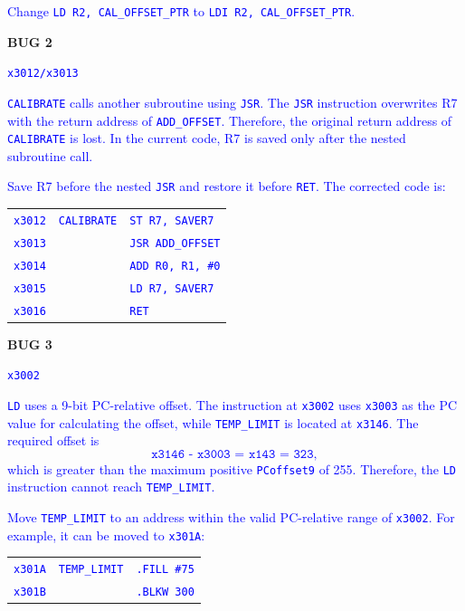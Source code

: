 \documentclass{article}
\begin{document}
\begin{enumerate}[label=(\alph*)]
\textcolor{blue}{
Change \texttt{LD R2, CAL\_OFFSET\_PTR} to
\texttt{LDI R2, CAL\_OFFSET\_PTR}.
}

\bigskip


\textbf{BUG 2}

\textcolor{blue}{\texttt{x3012/x3013}}

\textcolor{blue}{
\texttt{CALIBRATE} calls another subroutine using \texttt{JSR}.
The \texttt{JSR} instruction overwrites R7 with the return address
of \texttt{ADD\_OFFSET}. Therefore, the original return address of
\texttt{CALIBRATE} is lost. In the current code, R7 is saved only
after the nested subroutine call.
}

\textcolor{blue}{
Save R7 before the nested \texttt{JSR} and restore it before
\texttt{RET}. The corrected code is:
}

\begin{center}
\textcolor{blue}{
\begin{tabular}{lll}
\texttt{x3012} & \texttt{CALIBRATE} & \texttt{ST R7, SAVER7}\\
\texttt{x3013} &                    & \texttt{JSR ADD\_OFFSET}\\
\texttt{x3014} &                    & \texttt{ADD R0, R1, \#0}\\
\texttt{x3015} &                    & \texttt{LD R7, SAVER7}\\
\texttt{x3016} &                    & \texttt{RET}
\end{tabular}
}
\end{center}

\bigskip


\textbf{BUG 3}

\textcolor{blue}{\texttt{x3002}}

\textcolor{blue}{
\texttt{LD} uses a 9-bit PC-relative offset. The instruction at
\texttt{x3002} uses \texttt{x3003} as the PC value for calculating
the offset, while \texttt{TEMP\_LIMIT} is located at \texttt{x3146}.
The required offset is
\[
\texttt{x3146 - x3003 = x143 = 323},
\]
which is greater than the maximum positive \texttt{PCoffset9} of 255.
Therefore, the \texttt{LD} instruction cannot reach
\texttt{TEMP\_LIMIT}.
}

\textcolor{blue}{
Move \texttt{TEMP\_LIMIT} to an address within the valid
PC-relative range of \texttt{x3002}. For example, it can be moved to
\texttt{x301A}:
}

\begin{center}
\textcolor{blue}{
\begin{tabular}{lll}
\texttt{x301A} & \texttt{TEMP\_LIMIT} & \texttt{.FILL \#75}\\
\texttt{x301B} &                       & \texttt{.BLKW 300}
\end{tabular}
}
\end{center}


\end{enumerate}
\end{document}
